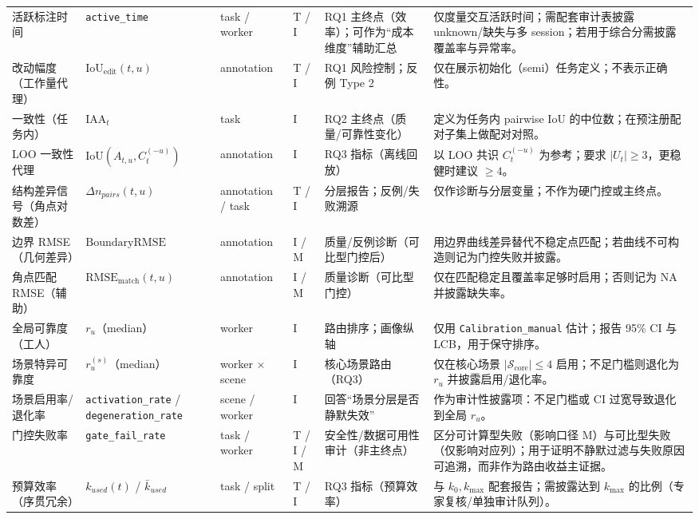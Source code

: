 \begin{longtable}{p{3cm} p{2.5cm} p{2cm} p{1.5cm} p{3cm} p{3.5cm}}
活跃标注时间 & \texttt{active\_time} & task / worker & T / I & RQ1 主终点（效率）；可作为“成本维度”辅助汇总 & 仅度量交互活跃时间；需配套审计表披露 unknown/缺失与多 session；若用于综合分需披露覆盖率与异常率。\\
改动幅度（工作量代理） & $\mathrm{IoU}_{\mathrm{edit}}(t,u)$ & annotation & T / I & RQ1 风险控制；反例 Type 2 & 仅在展示初始化（semi）任务定义；不表示正确性。\\
一致性（任务内） & $\mathrm{IAA}_t$ & task & I & RQ2 主终点（质量/可靠性变化） & 定义为任务内 pairwise IoU 的中位数；在预注册配对子集上做配对对照。\\
LOO 一致性代理 & $\mathrm{IoU}(A_{t,u},C_t^{(-u)})$ & annotation & I & RQ3 指标（离线回放） & 以 LOO 共识 $C_t^{(-u)}$ 为参考；要求 $|U_t|\ge 3$，更稳健时建议 $\ge 4$。\\
结构差异信号（角点对数差） & $\Delta n_{pairs}(t,u)$ & annotation / task & T / I & 分层报告；反例/失败溯源 & 仅作诊断与分层变量；不作为硬门控或主终点。\\
边界 RMSE（几何差异） & $\mathrm{BoundaryRMSE}$ & annotation & I / M & 质量/反例诊断（可比型门控后） & 用边界曲线差异替代不稳定点匹配；若曲线不可构造则记为门控失败并披露。\\
角点匹配 RMSE（辅助） & $\mathrm{RMSE}_{\mathrm{match}}(t,u)$ & annotation & I / M & 质量诊断（可比型门控） & 仅在匹配稳定且覆盖率足够时启用；否则记为 NA 并披露缺失率。\\
全局可靠度（工人） & $r_u$（median） & worker & I & 路由排序；画像纵轴 & 仅用 \texttt{Calibration\_manual} 估计；报告 95\% CI 与 LCB，用于保守排序。\\
场景特异可靠度 & $r_u^{(s)}$（median） & worker $\times$ scene & I & 核心场景路由（RQ3） & 仅在核心场景 $|\mathcal{S}_{\mathrm{core}}|\le 4$ 启用；不足门槛则退化为 $r_u$ 并披露启用/退化率。\\
场景启用率/退化率 & \texttt{activation\_rate} / \texttt{degeneration\_rate} & scene / worker & I & 回答“场景分层是否静默失效” & 作为审计性披露项：不足门槛或 CI 过宽导致退化到全局 $r_u$。\\
门控失败率 & \texttt{gate\_fail\_rate} & task / worker & T / I / M & 安全性/数据可用性审计（非主终点） & 区分可计算型失败（影响口径 M）与可比型失败（仅影响对应列）；用于证明不静默过滤与失败原因可追溯，而非作为路由收益主证据。\\
预算效率（序贯冗余） & $k_{used}(t)$ / $\bar{k}_{used}$ & task / split & T / I & RQ3 指标（预算效率） & 与 $k_0,k_{\max}$ 配套报告；需披露达到 $k_{\max}$ 的比例（专家复核/单独审计队列）。\\

\end{longtable}
